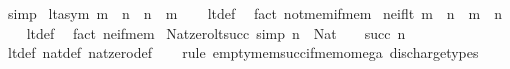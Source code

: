 \begin{isabellebody}
\ simp%
\endisatagproof
{\isafoldproof}%
%
\isadelimproof
\isanewline
%
\endisadelimproof
\isanewline
{}\isamarkupfalse%
\ lt{\isacharunderscore}{\kern0pt}asym{\isacharcolon}{\kern0pt}\ {\isachardoublequoteopen}m\ {\isacharless}{\kern0pt}\ n\ {\isasymLongrightarrow}\ {\isasymnot}{\isacharparenleft}{\kern0pt}n\ {\isacharless}{\kern0pt}\ m{\isacharparenright}{\kern0pt}{\isachardoublequoteclose}\isanewline
%
\isadelimproof
\ \ %
\endisadelimproof
%
\isatagproof
{}\isamarkupfalse%
\ lt{\isacharunderscore}{\kern0pt}def\ \isamarkupfalse%
\ {\isacharparenleft}{\kern0pt}fact\ not{\isacharunderscore}{\kern0pt}mem{\isacharunderscore}{\kern0pt}if{\isacharunderscore}{\kern0pt}mem{\isacharparenright}{\kern0pt}%
\endisatagproof
{\isafoldproof}%
%
\isadelimproof
\isanewline
%
\endisadelimproof
\isanewline
{}\isamarkupfalse%
\ ne{\isacharunderscore}{\kern0pt}if{\isacharunderscore}{\kern0pt}lt{\isacharcolon}{\kern0pt}\ {\isachardoublequoteopen}m\ {\isacharless}{\kern0pt}\ n\ {\isasymLongrightarrow}\ m\ {\isasymnoteq}\ n{\isachardoublequoteclose}\isanewline
%
\isadelimproof
\ \ %
\endisadelimproof
%
\isatagproof
{}\isamarkupfalse%
\ lt{\isacharunderscore}{\kern0pt}def\ \isamarkupfalse%
\ {\isacharparenleft}{\kern0pt}fact\ ne{\isacharunderscore}{\kern0pt}if{\isacharunderscore}{\kern0pt}mem{\isacharparenright}{\kern0pt}%
\endisatagproof
{\isafoldproof}%
%
\isadelimproof
\isanewline
%
\endisadelimproof
\isanewline
{}\isamarkupfalse%
\ Nat{\isacharunderscore}{\kern0pt}zero{\isacharunderscore}{\kern0pt}lt{\isacharunderscore}{\kern0pt}succ\ {\isacharbrackleft}{\kern0pt}simp{\isacharbrackright}{\kern0pt}{\isacharcolon}{\kern0pt}\ {\isachardoublequoteopen}n\ {\isacharcolon}{\kern0pt}\ Nat\ {\isasymLongrightarrow}\ {}\ {\isacharless}{\kern0pt}\ succ\ n{\isachardoublequoteclose}\isanewline
%
\isadelimproof
\ \ %
\endisadelimproof
%
\isatagproof
{}\isamarkupfalse%
\ lt{\isacharunderscore}{\kern0pt}def\ nat{\isacharunderscore}{\kern0pt}def\ nat{\isacharunderscore}{\kern0pt}zero{\isacharunderscore}{\kern0pt}def\isanewline
\ \ \isamarkupfalse%
\ {\isacharparenleft}{\kern0pt}rule\ empty{\isacharunderscore}{\kern0pt}mem{\isacharunderscore}{\kern0pt}succ{\isacharunderscore}{\kern0pt}if{\isacharunderscore}{\kern0pt}mem{\isacharunderscore}{\kern0pt}omega{\isacharparenright}{\kern0pt}\ discharge{\isacharunderscore}{\kern0pt}types%
\endisatagproof
{\isafoldproof}%
%
\isadelimproof
\isanewline
%
\endisadelimproof
\isanewline
{}\isamarkupfalse%

\end{isabellebody}
